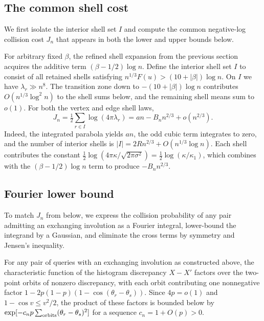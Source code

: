 \subsection{The common shell cost}
We first isolate the interior shell set $I$ and compute the common negative-log collision cost $J_n$ that appears in both the lower and upper bounds below.

For arbitrary fixed $\beta$, the refined shell expansion from the previous section acquires the additive term $(\beta-1/2)\log n$. Define the interior shell set $I$ to consist of all retained shells satisfying $n^{1/3}F(u)>(10+|\beta|)\log n$. On $I$ we have $\lambda_r\gg n^8$. The transition zone down to $-(10+|\beta|)\log n$ contributes $O(n^{1/3}\log^2 n)$ to the shell sums below, and the remaining shell means sum to $o(1)$. For both the vertex and edge shell laws,
\[
 J_n=\tfrac12\sum_{r\in I}\log(4\pi\lambda_r)
 =an-B_n n^{2/3}+o(n^{2/3}).
\]
Indeed, the integrated parabola yields $an$, the odd cubic term integrates to zero, and the number of interior shells is $|I|=2Rn^{2/3}+O(n^{1/3}\log n)$. Each shell contributes the constant $\tfrac12\log(4\pi\kappa/\sqrt{2\pi\sigma^2})=\tfrac12\log(\kappa/\kappa_1)$, which combines with the $(\beta-1/2)\log n$ term to produce $-B_n n^{2/3}$.

\subsection{Fourier lower bound}
To match $J_n$ from below, we express the collision probability of any pair admitting an exchanging involution as a Fourier integral, lower-bound the integrand by a Gaussian, and eliminate the cross terms by symmetry and Jensen's inequality.

For any pair of queries with an exchanging involution as constructed above, the characteristic function of the histogram discrepancy $X-X'$ factors over the two-point orbits of nonzero discrepancy, with each orbit contributing one nonnegative factor $1-2p(1-p)(1-\cos(\theta_r-\theta_s))$. Since $4p=o(1)$ and $1-\cos v\le v^2/2$, the product of these factors is bounded below by $\exp[-c_np\sum_{\rm orbits}(\theta_r-\theta_s)^2]$ for a sequence $c_n=1+O(p)>0$.

